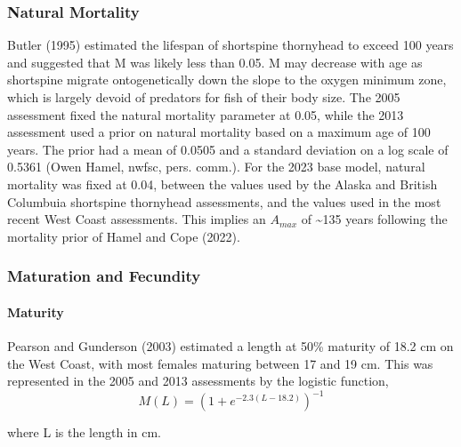 \documentclass[11pt,
  english,
  letterpaper,
]{article}
\begin{document}
\hypertarget{natural-mortality}{%
\subsubsection{Natural Mortality}\label{natural-mortality}}

Butler (1995) estimated the lifespan of shortspine thornyhead to exceed 100 years and suggested that M was likely less than 0.05. M may decrease with age as shortspine migrate ontogenetically down the slope to the oxygen minimum zone, which is largely devoid of predators for fish of their body size. The 2005 assessment fixed the natural mortality parameter at 0.05, while the 2013 assessment used a prior on natural mortality based on a maximum age of 100 years. The prior had a mean of 0.0505 and a standard deviation on a log scale of 0.5361 (Owen Hamel, \gls{nwfsc}, pers. comm.). For the 2023 base model, natural mortality was fixed at 0.04, between the values used by the Alaska and British Columbuia shortspine thornyhead assessments, and the values used in the most recent West Coast assessments. This implies an \(A_{max}\) of \textasciitilde135 years following the mortality prior of Hamel and Cope (2022).

\hypertarget{maturation-and-fecundity}{%
\subsubsection{Maturation and Fecundity}\label{maturation-and-fecundity}}

\hypertarget{maturity}{%
\paragraph{Maturity}\label{maturity}}

Pearson and Gunderson (2003) estimated a length at 50\% maturity of 18.2 cm on the West Coast, with most females maturing between 17 and 19 cm. This was represented in the 2005 and 2013 assessments by the logistic function, \begin{equation} M(L) = (1 + e^{-2.3(L-18.2)})^{-1}\end{equation}

where L is the length in cm.
\end{document}
